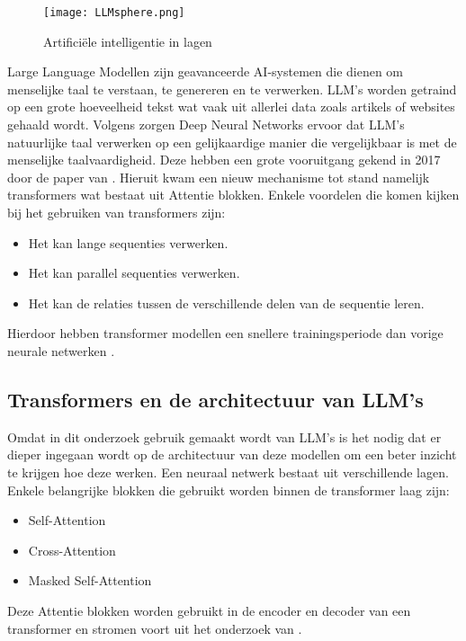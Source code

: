 \begin{figure}[h]
  \centering
  \texttt{[image: LLMsphere.png]}
  \caption{Artificiële intelligentie in lagen \autocite{Stoeffelbauer2023}}
  \label{fig:LLM-position}
\end{figure}

Large Language Modellen zijn geavanceerde AI-systemen die dienen om menselijke taal te verstaan, te genereren en te verwerken.
LLM's worden getraind op een grote hoeveelheid tekst wat vaak uit allerlei data zoals artikels of websites gehaald wordt. 
Volgens \textcite{Beelen2023} zorgen Deep Neural Networks ervoor dat LLM's natuurlijke taal verwerken op een gelijkaardige manier die vergelijkbaar is met de menselijke taalvaardigheid.
Deze hebben een grote vooruitgang gekend in 2017 door de paper van \textcite{VaswaniEtAl2017}. 
Hieruit kwam een nieuw mechanisme tot stand namelijk transformers wat bestaat uit Attentie blokken. 
Enkele voordelen die komen kijken bij het gebruiken van transformers zijn: 
\begin{itemize}
  \item Het kan lange sequenties verwerken.
  \item Het kan parallel sequenties verwerken.
  \item Het kan de relaties tussen de verschillende delen van de sequentie leren.
\end{itemize}
Hierdoor hebben transformer modellen een snellere trainingsperiode dan vorige neurale netwerken \autocite{aiml2023}.

\subsection{Transformers en de architectuur van LLM's}
\label{sec:architectuur-van-llms}
Omdat in dit onderzoek gebruik gemaakt wordt van LLM's is het nodig dat er dieper ingegaan wordt op de architectuur van deze modellen om een beter inzicht te krijgen hoe deze werken.
Een neuraal netwerk bestaat uit verschillende lagen. Enkele belangrijke blokken die gebruikt worden binnen de transformer laag zijn:
\begin{itemize}
  \item Self-Attention
  \item Cross-Attention
  \item Masked Self-Attention
\end{itemize}

Deze Attentie blokken worden gebruikt in de encoder en decoder van een transformer en stromen voort uit het onderzoek van \textcite{VaswaniEtAl2017}.

